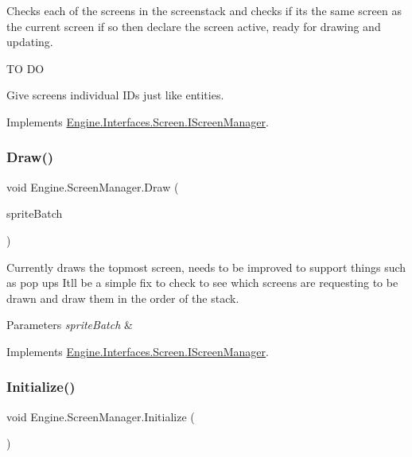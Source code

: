 Checks each of the screens in the screenstack and checks if its the same screen as the current screen if so then declare the screen active, ready for drawing and updating. 

TO DO

Give screens individual I\+Ds just like entities. 

Implements \hyperlink{a00470_a40fbf0a98c186ba93837f6279ad2f7dd}{Engine.\+Interfaces.\+Screen.\+I\+Screen\+Manager}.

\mbox{\label{a00538_a1177fbd3eb0a300167e4fa99930025e1}} 
\subsubsection{\texorpdfstring{Draw()}{Draw()}}
{\footnotesize\ttfamily void Engine.\+Screen\+Manager.\+Draw (\begin{DoxyParamCaption}\item[{Sprite\+Batch}]{sprite\+Batch }\end{DoxyParamCaption})\hspace{0.3cm}{\ttfamily [inline]}}



Currently draws the topmost screen, needs to be improved to support things such as pop ups It\textquotesingle{}ll be a simple fix to check to see which screens are requesting to be drawn and draw them in the order of the stack. 


\begin{DoxyParams}{Parameters}
{\em sprite\+Batch} & \\
\hline
\end{DoxyParams}


Implements \hyperlink{a00470_a28a87245d63c8df1634598b3d20a14cf}{Engine.\+Interfaces.\+Screen.\+I\+Screen\+Manager}.

\mbox{\label{a00538_aaa2b6fe0b50cf126bbb0a9b39fac1b83}} 
\subsubsection{\texorpdfstring{Initialize()}{Initialize()}}
{\footnotesize\ttfamily void Engine.\+Screen\+Manager.\+Initialize (\begin{DoxyParamCaption}{ }\end{DoxyParamCaption})\hspace{0.3cm}{\ttfamily [inline]}}



